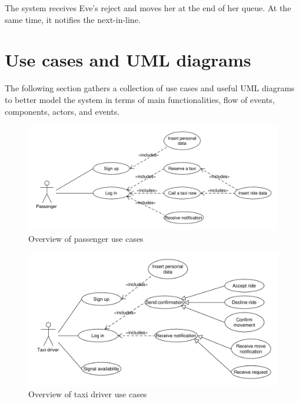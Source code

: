 The system receives Eve's reject and moves her at the end of her queue. At the same time, it notifies the next-in-line.


\section{Use cases and UML diagrams}
The following section gathers a collection of use cases and useful UML diagrams to better model the system in terms of main functionalities, flow of events, components, actors, and events.

\begin{figure}
\centering
\includegraphics[width=\textwidth]{tex-images/usecase-passenger}
\caption{Overview of passenger use cases}
\end{figure}

\begin{figure}
\centering
\includegraphics[width=\textwidth]{tex-images/usecase-driver}
\caption{Overview of taxi driver use cases}
\end{figure}


